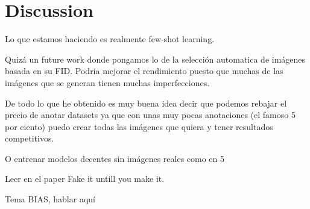 \chapter{Discussion} \label{sec:discussion}

Lo que estamos haciendo es realmente few-shot learning.

Quizá un future work donde pongamos  lo de la selección automatica de imágenes basada en su FID. Podria mejorar el rendimiento puesto que muchas de las imágenes que se generan tienen muchas imperfecciones.

De todo lo que he obtenido es muy buena idea decir que podemos rebajar el precio de anotar datasets ya que con unas muy pocas anotaciones (el famoso 5 por ciento) puedo crear todas las imágenes que quiera y tener resultados competitivos. 

O entrenar modelos decentes sin imágenes reales como en 5


Leer en el paper Fake it untill you make it.

Tema BIAS, hablar aquí